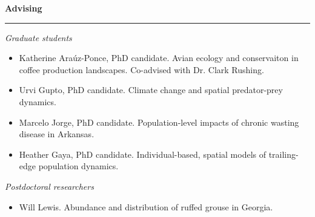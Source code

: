 {\large \bf Advising} \\
\rule[3mm]{\textwidth}{0.3mm}

{\it Graduate students}
\begin{itemize}
  \item Katherine Ara\'uz-Ponce, PhD candidate. Avian ecology and
    conservaiton in coffee production landscapes. Co-advised with
    Dr. Clark Rushing.
  \item Urvi Gupto, PhD candidate. Climate change and spatial
    predator-prey dynamics.  
  \item Marcelo Jorge, PhD candidate. Population-level impacts of
    chronic wasting disease in Arkansas.
  \item Heather Gaya, PhD candidate. Individual-based, spatial models
    of trailing-edge population dynamics.
\end{itemize}

{\it Postdoctoral researchers}
\begin{itemize}
   \item Will Lewis. Abundance and distribution of ruffed grouse in
     Georgia. 
\end{itemize}


